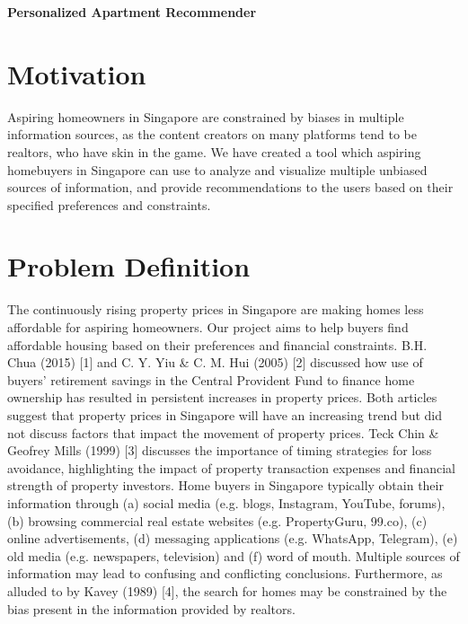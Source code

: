 \documentclass[a4paper, 11pt]{article}
\begin{document}
	\begin{center}
		\sc\large\textbf{Personalized Apartment Recommender}\\
	\end{center}
	

	\section{Motivation}
	
	Aspiring homeowners in Singapore are constrained by biases in multiple information sources, as the content creators on many platforms tend to be realtors, who have skin in the game. We have created a tool which aspiring homebuyers in Singapore can use to analyze and visualize multiple unbiased sources of information, and provide recommendations to the users based on their specified preferences and constraints. 

	\section{Problem Definition}
	
	The continuously rising property prices in Singapore are making homes less affordable for aspiring homeowners. Our project aims to help buyers find affordable housing based on their preferences and financial constraints. B.H. Chua (2015) [1] and C. Y. Yiu \& C. M. Hui (2005) [2] discussed how use of buyers’ retirement savings in the Central Provident Fund to finance home ownership has resulted in persistent increases in property prices. Both articles suggest that property prices in Singapore will have an increasing trend but did not discuss factors that impact the movement of property prices. Teck Chin \& Geofrey Mills (1999) [3] discusses the importance of timing strategies for loss avoidance, highlighting the impact of property transaction expenses and financial strength of property investors. Home buyers in Singapore typically obtain their information through (a) social media (e.g. blogs, Instagram, YouTube, forums), (b) browsing commercial real estate websites (e.g. PropertyGuru, 99.co), (c) online advertisements, (d) messaging applications (e.g. WhatsApp, Telegram), (e) old media (e.g. newspapers, television) and (f) word of mouth. Multiple sources of information may lead to confusing and conflicting conclusions. Furthermore, as alluded to by Kavey (1989) [4], the search for homes may be constrained by the bias present in the information provided by realtors.
\end{document}
